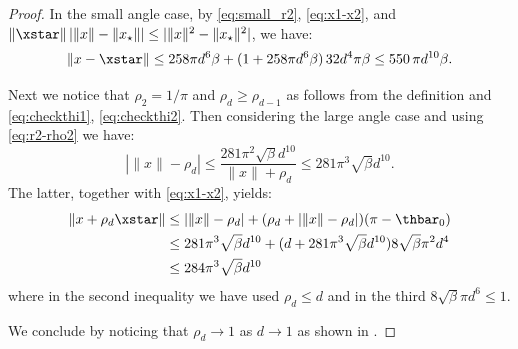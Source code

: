 \begin{proof}
	In the small angle case, by \eqref{eq:small_r2}, \eqref{eq:x1-x2}, and $\|\xstar\|\, |\|x\| - \|x_\star \| | \leq |\|x\|^2 - \|x_\star \|^2 |$,   we have: 
	\[
	\|x - \xstar \| \leq  258 \pi d^6 \beta + (1 + 258 \pi d^6 \beta)\, 32 d^4 \pi \beta 
	\leq 550\, \pi d^{10} \beta.
	\]
	
	Next we notice that $\rho_2 = 1/\pi$ and $\rho_{d} \geq \rho_{d-1}$  
	as follows from the definition and \eqref{eq:checkthi1}, \eqref{eq:checkthi2}. Then considering the large angle case and using 
	\eqref{eq:r2-rho2} we have:
	\[
	|\|x\| - \rho_d | \leq \frac{281 \pi^2 \sqrt{\beta} d^{10}}{\|x\| + \rho_d} \leq 281 \pi^3 \sqrt{\beta} d^{10}.
	\]
	The latter, together with \eqref{eq:x1-x2}, yields:
	\[
	\begin{aligned}
	\|x + \rho_d \xstar \| &\leq |\|x\| -  \rho_d | + (\rho_d+ |\|x\| - \rho_d|)(\pi- \thbar_0) \\
	&\leq 281 \pi^3 \sqrt{\beta} d^{10} + (d + 281 \pi^3 \sqrt{\beta} d^{10}) 8 \sqrt{\beta} \pi^2 d^4 \\
	&\leq 284 \pi^3 \sqrt{\beta} d^{10}
	\end{aligned}
	\]
	where in the second inequality we have used $\rho_d \leq d$ and in the third $8 \sqrt{\beta} \pi d^6 \leq 1$.
	
	We conclude by noticing that $\rho_d \to 1$ as $d \to 1$ as shown in \citep[Lemma 16]{HHHV18}. 
\end{proof}
